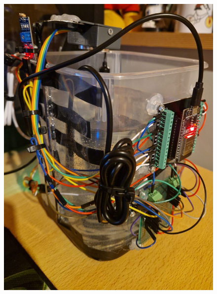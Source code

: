 \documentclass[11pt,a4paper]{article}
\begin{document}
\begin{figure}[h!]
\begin{minipage}{0.33\textwidth}
        \includegraphics[width=\linewidth]{Images/trasProt.jpeg}
    \end{minipage}
\end{figure}
\end{document}
